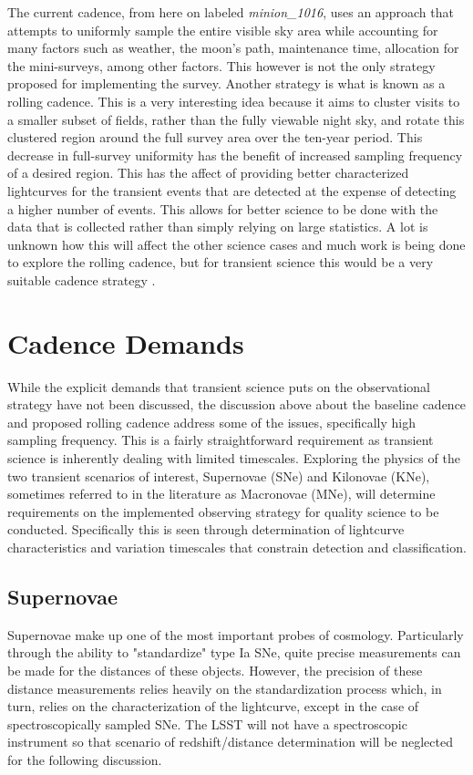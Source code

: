 \documentclass[11pt]{article}
\begin{document}
The current cadence, from here on labeled \textit{minion\_1016}, uses an approach that attempts to uniformly sample the entire visible sky area while accounting for many factors such as weather, the moon's path, maintenance time, allocation for the mini-surveys, among other factors. This however is not the only strategy proposed for implementing the survey. Another strategy is what is known as a rolling cadence. This is a very interesting idea because it aims to cluster visits to a smaller subset of fields, rather than the fully viewable night sky, and rotate this clustered region around the full survey area over the ten-year period. This decrease in full-survey uniformity has the benefit of increased sampling frequency of a desired region. This has the affect of providing better characterized lightcurves for the transient events that are detected at the expense of detecting a higher number of events. This allows for better science to be done with the data that is collected rather than simply relying on large statistics. A lot is unknown how this will affect the other science cases and much work is being done to explore the rolling cadence, but for transient science this would be a very suitable cadence strategy \citep{LSSTScienceCollaboration2017}. \par

\section{Cadence Demands} %
While the explicit demands that transient science puts on the observational strategy have not been discussed, the discussion above about the baseline cadence and proposed rolling cadence address some of the issues, specifically high sampling frequency. This is a fairly straightforward requirement as transient science is inherently dealing with limited timescales. Exploring the physics of the two transient scenarios of interest, Supernovae (SNe) and Kilonovae (KNe), sometimes referred to in the literature as Macronovae (MNe), will determine requirements on the implemented observing strategy for quality science to be conducted. Specifically this is seen through determination of lightcurve characteristics and variation timescales that constrain detection and classification. \par

\subsection{Supernovae}
Supernovae make up one of the most important probes of cosmology. Particularly through the ability to "standardize" type Ia SNe, quite precise measurements can be made for the distances of these objects. However, the precision of these distance measurements relies heavily on the standardization process which, in turn, relies on the characterization of the lightcurve, except in the case of spectroscopically sampled SNe. The LSST will not have a spectroscopic instrument so that scenario of redshift/distance determination will be neglected for the following discussion. \par
\end{document}
